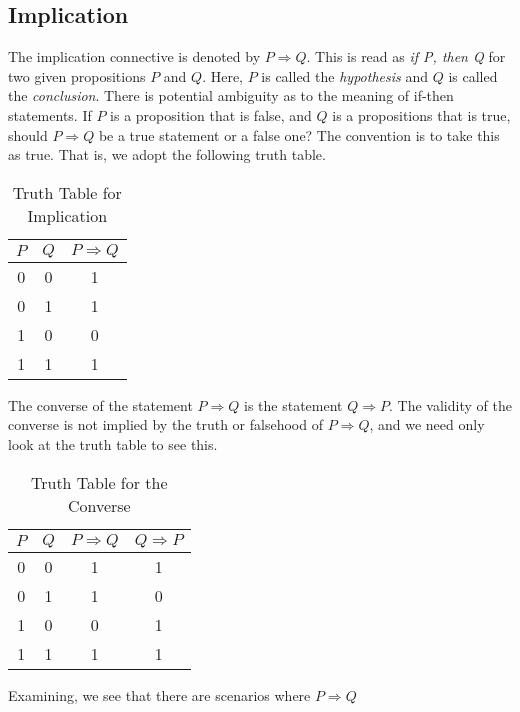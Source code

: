     \subsection{Implication}
        The implication connective is denoted by $P\Rightarrow{Q}$. This is read
        as \textit{if P, then Q} for two given propositions $P$ and $Q$. Here,
        $P$ is called the \textit{hypothesis} and $Q$ is called the
        \textit{conclusion}. There is potential ambiguity as to the meaning of
        if-then statements. If $P$ is a proposition that is false, and $Q$ is a
        propositions that is true, should $P\Rightarrow{Q}$ be a true statement
        or a false one? The convention is to take this as true. That is, we
        adopt the following truth table.
        \begin{table}[H]
            \centering
            \captionsetup{type=table}
            \begin{tabular}{ccc}
                $P$&$Q$&$P\Rightarrow{Q}$\\
                \hline
                0&0&1\\
                0&1&1\\
                1&0&0\\
                1&1&1
            \end{tabular}
            \caption{Truth Table for Implication}
            \label{tab:Truth_Table_for_Implication}
        \end{table}
        The converse of the statement $P\Rightarrow{Q}$ is the statement
        $Q\Rightarrow{P}$. The validity of the converse is not implied by the
        truth or falsehood of $P\Rightarrow{Q}$, and we need only look at the
        truth table to see this.
        \begin{table}[H]
            \centering
            \captionsetup{type=table}
            \begin{tabular}{cccc}
                $P$&$Q$&$P\Rightarrow{Q}$&$Q\Rightarrow{P}$\\
                \hline
                0&0&1&1\\
                0&1&1&0\\
                1&0&0&1\\
                1&1&1&1
            \end{tabular}
            \caption{Truth Table for the Converse}
            \label{tab:Truth_Table_for_Converse}
        \end{table}
        Examining, we see that there are scenarios where $P\Rightarrow{Q}$
